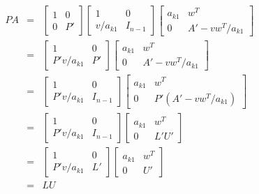 \begin{eqnarray*}
    PA&=&\left[\begin{array}{cc}
        1&0\\
        0&P'
    \end{array}\right]
    \left[\begin{array}{cc}
        1&0\\
        v/a_{k1}&I_{n-1}
    \end{array}\right]
    \left[\begin{array}{cc}
        a_{k1}&w^T\\
        0&A'-vw^T/a_{k1}
    \end{array}\right]\\
    &=&\left[\begin{array}{cc}
        1&0\\
        P'v/a_{k1}&P'
    \end{array}\right]
    \left[\begin{array}{cc}
        a_{k1}&w^T\\
        0&A'-vw^T/a_{k1}
    \end{array}\right]\\
    &=&\left[\begin{array}{cc}
        1&0\\
        P'v/a_{k1}&I_{n-1}
    \end{array}\right]
    \left[\begin{array}{cc}
        a_{k1}&w^T\\
        0&P'(A'-vw^T/a_{k1})
    \end{array}\right]\\
    &=&\left[\begin{array}{cc}
        1&0\\
        P'v/a_{k1}&I_{n-1}
    \end{array}\right]
    \left[\begin{array}{cc}
        a_{k1}&w^T\\
        0&L'U'
    \end{array}\right]\\
    &=&\left[\begin{array}{cc}
        1&0\\
        P'v/a_{k1}&L'
    \end{array}\right]
    \left[\begin{array}{cc}
        a_{k1}&w^T\\
        0&U'
    \end{array}\right]\\
    &=&LU
\end{eqnarray*}

